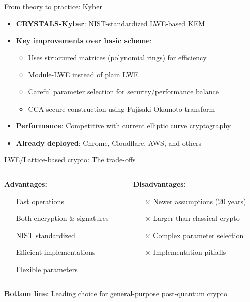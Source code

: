 \documentclass[aspectratio=169, lualatex, handout]{beamer}
\begin{document}
\begin{frame}{From theory to practice: Kyber}
	\begin{itemize}
		\item \textbf{CRYSTALS-Kyber}: NIST-standardized LWE-based KEM
		\item \textbf{Key improvements over basic scheme}:
		      \begin{itemize}
			      \item Uses structured matrices (polynomial rings) for efficiency
			      \item Module-LWE instead of plain LWE
			      \item Careful parameter selection for security/performance balance
			      \item CCA-secure construction using Fujisaki-Okamoto transform
		      \end{itemize}
		\item \textbf{Performance}: Competitive with current elliptic curve cryptography
		\item \textbf{Already deployed}: Chrome, Cloudflare, AWS, and others
	\end{itemize}
\end{frame}

\begin{frame}{LWE/Lattice-based crypto: The trade-offs}
	\begin{columns}[c]
		\begin{column}{0.5\textwidth}
			\textbf{Advantages:}
			\begin{itemize}
				\item[\mycheckmark] Fast operations
				\item[\mycheckmark] Both encryption \& signatures
				\item[\mycheckmark] NIST standardized
				\item[\mycheckmark] Efficient implementations
				\item[\mycheckmark] Flexible parameters
			\end{itemize}
		\end{column}
		\begin{column}{0.5\textwidth}
			\textbf{Disadvantages:}
			\begin{itemize}
				\item[$\times$] Newer assumptions (20 years)
				\item[$\times$] Larger than classical crypto
				\item[$\times$] Complex parameter selection
				\item[$\times$] Implementation pitfalls
			\end{itemize}
		\end{column}
	\end{columns}
	\vspace{5mm}
	\begin{center}
		\textbf{Bottom line}: Leading choice for general-purpose post-quantum crypto
	\end{center}
\end{frame}
\end{document}
